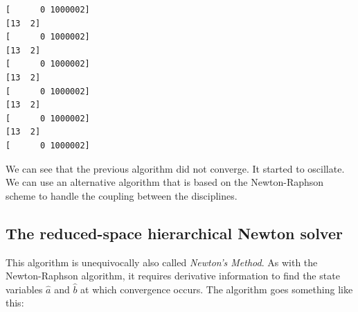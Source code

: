 \documentclass[11pt]{article}
\begin{document}
    \begin{Verbatim}[commandchars=\\\{\}]
[      0 1000002]
[13  2]
[      0 1000002]
[13  2]
[      0 1000002]
[13  2]
[      0 1000002]
[13  2]
[      0 1000002]
[13  2]
[      0 1000002]
    \end{Verbatim}

    We can see that the previous algorithm did not converge. It started to
oscillate. We can use an alternative algorithm that is based on the
Newton-Raphson scheme to handle the coupling between the disciplines.

    \hypertarget{the-reduced-space-hierarchical-newton-solver}{%
\subsection{The reduced-space hierarchical Newton
solver}\label{the-reduced-space-hierarchical-newton-solver}}

This algorithm is unequivocally also called \emph{Newton's Method}. As
with the Newton-Raphson algorithm, it requires derivative information to
find the state variables \(\hat{a}\) and \(\hat{b}\) at which
convergence occurs. The algorithm goes something like this:
\end{document}
